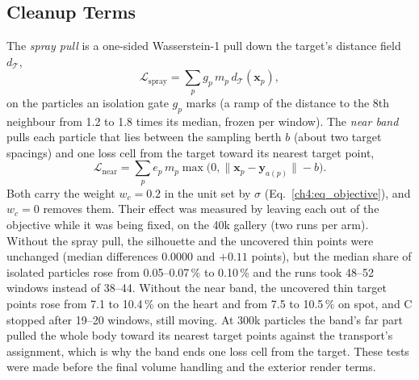 \subsection{Cleanup Terms}
\label{ch4:sec_cleanup}
The \emph{spray pull} is a one-sided Wasserstein-1 pull down the target's distance field $d_{\mathcal{T}}$,
\begin{equation}
\label{ch4:eq_spray}
\mathcal{L}_{\mathrm{spray}}=\sum_p g_p\, m_p\, d_{\mathcal{T}}(\mathbf{x}_p),
\end{equation}
on the particles an isolation gate $g_p$ marks (a ramp of the distance to the 8th neighbour from 1.2 to 1.8 times its
median, frozen per window). The \emph{near band} pulls each particle that lies between the sampling berth $b$ (about two
target spacings) and one loss cell from the target toward its nearest target point,
\begin{equation}
\label{ch4:eq_near}
\mathcal{L}_{\mathrm{near}}=\sum_p e_p\, m_p\max\big(0,\lVert\mathbf{x}_p-\mathbf{y}_{a(p)}\rVert-b\big).
\end{equation}
Both carry the weight $w_c=0.2$ in the unit set by $\sigma$ (Eq.~\eqref{ch4:eq_objective}), and $w_c=0$ removes them.
Their effect was measured by leaving each out of the objective while it was being fixed, on the 40k gallery (two runs per
arm). Without the spray pull, the silhouette and the uncovered thin points were unchanged (median differences 0.0000 and
$+0.11$ points), but the median share of isolated particles rose from 0.05--0.07\,\% to 0.10\,\% and the runs took 48--52
windows instead of 38--44. Without the near band, the uncovered thin target points rose from 7.1 to 10.4\,\% on the heart
and from 7.5 to 10.5\,\% on spot, and C stopped after 19--20 windows, still moving. At 300k particles the band's far part
pulled the whole body toward its nearest target points against the transport's assignment, which is why the band ends one
loss cell from the target. These tests were made before the final volume handling and the exterior render terms.

